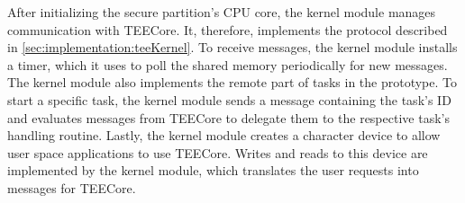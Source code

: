After initializing the secure partition's CPU core, the kernel module manages
communication with TEECore. It, therefore, implements the protocol described in
\ref{sec:implementation:teeKernel}. To receive messages, the kernel module
installs a timer, which it uses to poll the shared memory periodically for new
messages. The kernel module also implements the remote part of tasks in the
prototype. To start a specific task, the kernel module sends a message
containing the task's ID and evaluates messages from TEECore to delegate them to
the respective task's handling routine. Lastly, the kernel module creates a
character device to allow user space applications to use TEECore. Writes and
reads to this device are implemented by the kernel module, which translates the
user requests into messages for TEECore.

